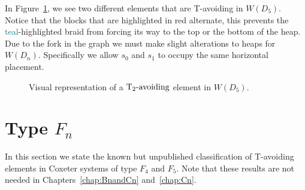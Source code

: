 In Figure~\ref{fig:Dtavoid}, we see two different elements that are T-avoiding in $W(D_5)$. Notice that the blocks that are highlighted in \textcolor{rred}{red} alternate, this prevents the \textcolor{teal}{teal}-highlighted braid from forcing its way to the top or the bottom of the heap. Due to the fork in the graph we must make slight alterations to heaps for $W(D_n)$. Specifically we allow $s_0$ and $s_1$ to occupy the same horizontal placement. 

\begin{figure}[h!]\centering

{}
\caption{Visual representation of a $\operatorname{T_2-\mathrm{avoiding}}$ element in $W(D_5)$.}\label{fig:Dtavoid}
\end{figure}


\section{Type $F_n$}

In this section we state the known but unpublished classification of T-avoiding elements in Coxeter systems of type $F_4$ and $F_5$. Note that these results are not needed in Chapters~\ref{chap:BnandCn} and~\ref{chap:Cn}. %


